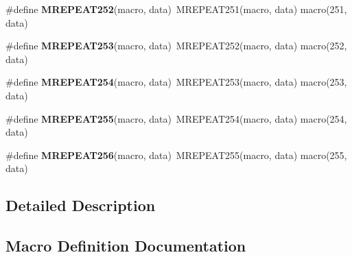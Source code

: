 \begin{DoxyCompactItemize}
\item 
\hypertarget{group__group__sam0__utils__mrepeat_ga83ac32e68c09ace0114ad0af4f39b7df}{}\#define {\bfseries M\+R\+E\+P\+E\+A\+T252}(macro,  data)~M\+R\+E\+P\+E\+A\+T251(macro, data)   macro(251, data)\label{group__group__sam0__utils__mrepeat_ga83ac32e68c09ace0114ad0af4f39b7df}

\item 
\hypertarget{group__group__sam0__utils__mrepeat_gafbbb5e11ca1e4ca9c893de68c868a4cb}{}\#define {\bfseries M\+R\+E\+P\+E\+A\+T253}(macro,  data)~M\+R\+E\+P\+E\+A\+T252(macro, data)   macro(252, data)\label{group__group__sam0__utils__mrepeat_gafbbb5e11ca1e4ca9c893de68c868a4cb}

\item 
\hypertarget{group__group__sam0__utils__mrepeat_gaf3e63914581123ee4c557b0c3b98003b}{}\#define {\bfseries M\+R\+E\+P\+E\+A\+T254}(macro,  data)~M\+R\+E\+P\+E\+A\+T253(macro, data)   macro(253, data)\label{group__group__sam0__utils__mrepeat_gaf3e63914581123ee4c557b0c3b98003b}

\item 
\hypertarget{group__group__sam0__utils__mrepeat_ga9db19e5893568dfa7130030f09a45eba}{}\#define {\bfseries M\+R\+E\+P\+E\+A\+T255}(macro,  data)~M\+R\+E\+P\+E\+A\+T254(macro, data)   macro(254, data)\label{group__group__sam0__utils__mrepeat_ga9db19e5893568dfa7130030f09a45eba}

\item 
\hypertarget{group__group__sam0__utils__mrepeat_gaa49bde8a3b34d9a86caf1c0397d5993f}{}\#define {\bfseries M\+R\+E\+P\+E\+A\+T256}(macro,  data)~M\+R\+E\+P\+E\+A\+T255(macro, data)   macro(255, data)\label{group__group__sam0__utils__mrepeat_gaa49bde8a3b34d9a86caf1c0397d5993f}

\end{DoxyCompactItemize}


\subsection{Detailed Description}


\subsection{Macro Definition Documentation}
\hypertarget{group__group__sam0__utils__mrepeat_ga42db715ccb877ca87d7903f5783bd104}{}
